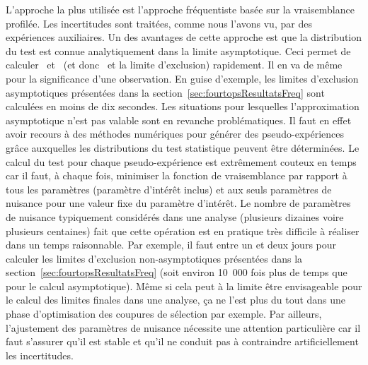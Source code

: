L'approche la plus utilis\'ee est l'approche fr\'equentiste bas\'ee sur la vraisemblance profil\'ee. Les incertitudes sont trait\'ees, comme nous l'avons vu, par des exp\'eriences auxiliaires. Un des avantages de cette approche est
que la distribution du test est connue analytiquement dans la limite asymptotique. Ceci permet de calculer \CLsb~et \CLb~(et donc \CLs~et la limite d'exclusion) rapidement. Il en va de m\^eme pour la significance d'une observation. 
En guise d'exemple, les limites d'exclusion asymptotiques pr\'esent\'ees dans la section~\ref{sec:fourtopsResultatsFreq} sont calcul\'ees en moins de dix secondes. 
Les situations pour lesquelles l'approximation asymptotique n'est pas valable sont en revanche probl\'ematiques. 
Il faut en effet avoir recours \`a des m\'ethodes num\'eriques pour g\'en\'erer des pseudo-exp\'eriences gr\^ace auxquelles les distributions du test statistique peuvent \^etre d\'etermin\'ees. 
Le calcul du test pour chaque pseudo-exp\'erience est extr\^emement couteux en temps car il faut, \`a chaque fois, minimiser la fonction de vraisemblance par rapport \`a tous les param\`etres (param\`etre d'int\'er\^et inclus) et aux seuls param\`etres de nuisance pour une valeur fixe du param\`etre d'int\'er\^et. 
Le nombre de param\`etres de nuisance typiquement consid\'er\'es dans une analyse (plusieurs dizaines voire plusieurs centaines) fait que cette op\'eration est en pratique tr\`es difficile \`a r\'ealiser dans un temps raisonnable. 
Par exemple, il faut entre un et deux jours pour calculer les limites d'exclusion non-asymptotiques pr\'esent\'ees dans la section~\ref{sec:fourtopsResultatsFreq} (soit environ 10~000 fois plus de temps que pour le calcul asymptotique).
M\^eme si cela peut \`a la limite \^etre envisageable pour le calcul des limites finales dans une analyse, \c ca ne l'est plus du tout dans une phase d'optimisation des coupures de s\'election par exemple. 
Par ailleurs, l'ajustement des param\`etres de nuisance n\'ecessite une attention particuli\`ere car il faut s'assurer qu'il est stable et qu'il ne conduit pas \`a contraindre artificiellement les incertitudes.

